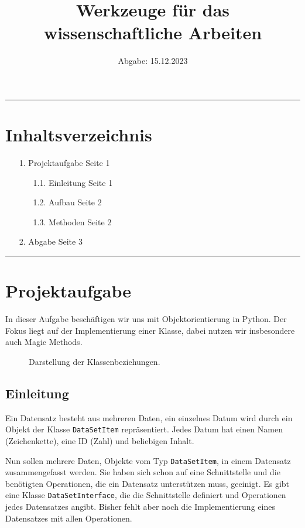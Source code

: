 \documentclass[a4paper,12pt]{article}
\title{Werkzeuge für das wissenschaftliche Arbeiten}
\author{}
\date{Abgabe: 15.12.2023}
\begin{document}
\maketitle
\vspace{-2em}
\hrule

\section*{Inhaltsverzeichnis}
\begin{enumerate}[leftmargin=1.5cm]
    \item[1.] Projektaufgabe \dotfill Seite 1
    \begin{enumerate}[leftmargin=1cm]
        \item[1.1.] Einleitung \dotfill Seite 1
        \item[1.2.] Aufbau \dotfill Seite 2
        \item[1.3.] Methoden \dotfill Seite 2
    \end{enumerate}
    \item[2.] Abgabe \dotfill Seite 3
\end{enumerate}
\hrule

\section{Projektaufgabe}
In dieser Aufgabe beschäftigen wir uns mit Objektorientierung in Python. Der Fokus liegt auf der Implementierung einer Klasse, dabei nutzen wir insbesondere auch Magic Methods.

\begin{figure}[h!]
    \centering
    
    \caption{Darstellung der Klassenbeziehungen.}
    \label{fig:class_relations}
\end{figure}

\subsection{Einleitung}
Ein Datensatz besteht aus mehreren Daten, ein einzelnes Datum wird durch ein Objekt der Klasse \texttt{DataSetItem} repräsentiert. Jedes Datum hat einen Namen (Zeichenkette), eine ID (Zahl) und beliebigen Inhalt.

Nun sollen mehrere Daten, Objekte vom Typ \texttt{DataSetItem}, in einem Datensatz zusammengefasst werden. Sie haben sich schon auf eine Schnittstelle und die benötigten Operationen, die ein Datensatz unterstützen muss, geeinigt. Es gibt eine Klasse \texttt{DataSetInterface}, die die Schnittstelle definiert und Operationen jedes Datensatzes angibt. Bisher fehlt aber noch die Implementierung eines Datensatzes mit allen Operationen.
\end{document}

